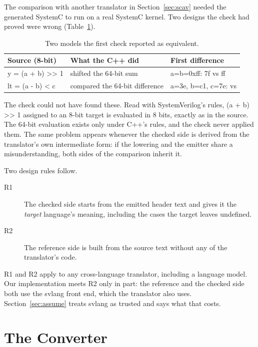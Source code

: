 \documentclass{ieeeaccess}
\newcommand{\code}[1]{{\fontshape{n}\ttfamily #1}}
\begin{document}
The comparison with another translator in Section~\ref{sec:scav} needed the generated SystemC to
run on a real SystemC kernel. Two designs the check had proved were wrong
(Table~\ref{tab:fooled}).

\begin{table}[h]
\centering
\caption{Two models the first check reported as equivalent.}
\label{tab:fooled}
\footnotesize
\setlength{\tabcolsep}{3pt}
\begin{tabularx}{\columnwidth}{@{}l >{\raggedright\arraybackslash}X l@{}}
\toprule
Source (8-bit) & What the C++ did & First difference \\
\midrule
\code{y = (a + b) {>}{>} 1} & shifted the 64-bit sum & \code{a=b=0xff}: \code{7f} vs \code{ff} \\
\code{lt = (a - b) < c} & compared the 64-bit difference & \code{a=3e, b=c1, c=7e}: \code{1} vs \code{0} \\
\bottomrule
\end{tabularx}
\end{table}

The check could not have found these. Read with SystemVerilog's rules, \code{(a + b) {>}{>} 1}
assigned to an 8-bit target is evaluated in 8 bits, exactly as in the source. The 64-bit
evaluation exists only under C++'s rules, and the check never applied them. The same problem
appears whenever the checked side is derived from the translator's own intermediate form: if the
lowering and the emitter share a misunderstanding, both sides of the comparison inherit it.

Two design rules follow.
\begin{description}
\item[R1] The checked side starts from the emitted header text and gives it the \emph{target}
language's meaning, including the cases the target leaves undefined.
\item[R2] The reference side is built from the source text without any of the translator's code.
\end{description}
R1 and R2 apply to any cross-language translator, including a language model. Our implementation
meets R2 only in part: the reference and the checked side both use the \code{svlang} front end,
which the translator also uses. Section~\ref{sec:assume} treats \code{svlang} as trusted and says
what that costs.

\section{The Converter}
\label{sec:convert}
\end{document}
